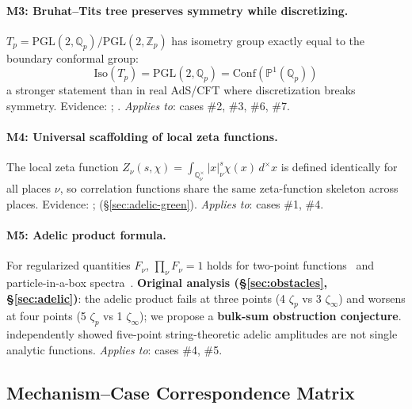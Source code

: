 \documentclass[11pt,a4paper]{article}
\newcommand{\Qp}{\mathbb{Q}_p}
\newcommand{\Zp}{\mathbb{Z}_p}
\newcommand{\Pone}{\mathbb{P}^1}
\newcommand{\Tp}{T_p}
\newcommand{\PGL}{\mathrm{PGL}}
\newcommand{\Conf}{\mathrm{Conf}}
\newcommand{\Iso}{\mathrm{Iso}}
\newcommand{\BirTits}{Bruhat--Tits}
\begin{document}
\paragraph{M3: \BirTits{} tree preserves symmetry while discretizing.}
$\Tp = \PGL(2,\Qp)/\PGL(2,\Zp)$ has isometry group exactly equal to the boundary conformal group:
\begin{equation}
\Iso(\Tp) = \PGL(2, \Qp) = \Conf(\Pone(\Qp))
\end{equation}
a stronger statement than in real AdS/CFT where discretization breaks symmetry. Evidence: \cite{HMSS16}; \cite{P19}. \emph{Applies to}: cases \#2, \#3, \#6, \#7.

\paragraph{M4: Universal scaffolding of local zeta functions.}
The local zeta function $Z_\nu(s, \chi) = \int_{\mathbb{Q}_\nu^\times} |x|_\nu^s \chi(x) \, d^\times x$ is defined identically for all places $\nu$, so correlation functions share the same zeta-function skeleton across places. Evidence: \cite{GP17}; \cite{HSYZ20} (\S\ref{sec:adelic-green}). \emph{Applies to}: cases \#1, \#4.

\paragraph{M5: Adelic product formula.}
For regularized quantities $F_\nu$, $\prod_\nu F_\nu = 1$ holds for two-point functions~\cite{HSYZ20} and particle-in-a-box spectra~\cite{HMS20}. \textbf{Original analysis (\S\ref{sec:obstacles}, \S\ref{sec:adelic})}: the adelic product fails at three points (4 $\zeta_p$ vs 3 $\zeta_\infty$) and worsens at four points (5 $\zeta_p$ vs 1 $\zeta_\infty$); we propose a \textbf{bulk-sum obstruction conjecture}. \cite{J22} independently showed five-point string-theoretic adelic amplitudes are not single analytic functions. \emph{Applies to}: cases \#4, \#5.

\subsection{Mechanism--Case Correspondence Matrix}
\label{sec:matrix}
\end{document}
